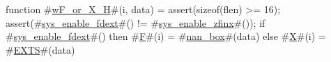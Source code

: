 function #\hyperref[sailRISCVzwFzyorzyXzyH]{wF\_or\_X\_H}#(i, data) = {
  assert(sizeof(flen) >= 16);
  assert(#\hyperref[sailRISCVzsyszyenablezyfdext]{sys\_enable\_fdext}#() != #\hyperref[sailRISCVzsyszyenablezyzzfinx]{sys\_enable\_zfinx}#());
  if   #\hyperref[sailRISCVzsyszyenablezyfdext]{sys\_enable\_fdext}#()
  then #\hyperref[sailRISCVzF]{F}#(i) = #\hyperref[sailRISCVznanzybox]{nan\_box}#(data)
  else #\hyperref[sailRISCVzX]{X}#(i) = #\hyperref[sailRISCVzEXTS]{EXTS}#(data)
}
